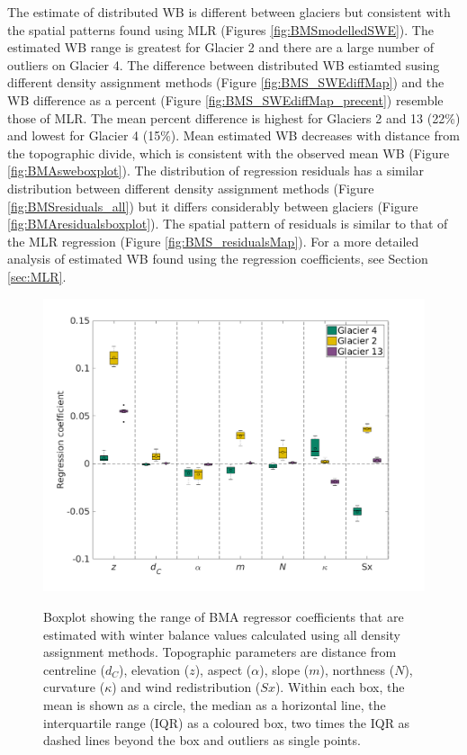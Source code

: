 \documentclass{sfuthesis}
\newcommand{\params}{Topographic parameters are distance from centreline ($d_C$), elevation ($z$), aspect ($\alpha$), slope ($m$), northness ($N$), curvature ($\kappa$) and wind redistribution ($Sx$). }
\newcommand{\boxplot}{Within each box, the mean is shown as a circle, the median as a horizontal line, the interquartile range (IQR) as a coloured box, two times the IQR as dashed lines beyond the box and outliers as single points. }
\begin{document}
The estimate of distributed WB is different between glaciers but consistent with the spatial patterns found using MLR (Figures \ref{fig:BMSmodelledSWE}). The estimated WB range is greatest for Glacier 2 and there are a large number of outliers on Glacier 4. The difference between distributed WB estiamted susing different density assignment methods (Figure \ref{fig:BMS_SWEdiffMap}) and the WB difference as a percent (Figure \ref{fig:BMS_SWEdiffMap_precent}) resemble those of MLR. The mean percent difference is highest for Glaciers 2 and 13 (22\%) and lowest for Glacier 4 (15\%). Mean estimated WB decreases with distance from the topographic divide, which is consistent with the observed mean WB (Figure \ref{fig:BMAsweboxplot}). The distribution of regression residuals has a similar distribution between different density assignment methods (Figure \ref{fig:BMSresiduals_all}) but it differs considerably between glaciers (Figure \ref{fig:BMAresidualsboxplot}). The spatial pattern of residuals is similar to that of the MLR regression (Figure \ref{fig:BMS_residualsMap}). For a more detailed analysis of estimated WB found using the regression coefficients, see Section \ref{sec:MLR}. 

\begin{figure}[H]
	\centering
	\includegraphics[width =1.1 \textwidth]{BMScoeff_DensityOpts.png}\\
	\caption{Boxplot showing the range of BMA regressor coefficients that are estimated with winter balance values calculated using all density assignment methods. \params \boxplot }
	\label{fig:BMAcoeff_densityOptions}
\end{figure}
\end{document}
